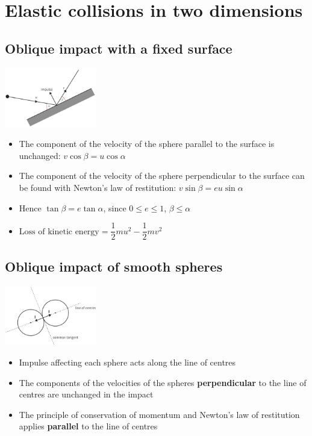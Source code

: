 \documentclass[11pt, A4paper]{article}
\begin{document}
	\section[5 Elastic collisions in two dimensions]{Elastic collisions in two dimensions}
	\subsection{Oblique impact with a fixed surface}
	\includegraphics[width=0.3\textwidth]{obliqueimpact}
	\begin{itemize}
		\item The component of the velocity of the sphere parallel to the surface is unchanged: $v\cos\beta = u\cos\alpha$
		\item The component of the velocity of the sphere perpendicular to the surface can be found with Newton's law of restitution: $v\sin\beta = eu\sin\alpha$
		\item Hence $\tan\beta = e\tan\alpha$, since $0 \leq e \leq 1$, $\beta \leq \alpha$
		\item $\text{Loss of kinetic energy}=\dfrac{1}{2}mu^2-\dfrac{1}{2}mv^2$
	\end{itemize}
	\subsection{Oblique impact of smooth spheres}
	\includegraphics[width=0.3\textwidth]{oblique_2_balls}
	\begin{itemize}
		\item Impulse affecting each sphere acts along the line of centres
		\item The components of the velocities of the spheres \textbf{perpendicular}  to the line of centres are unchanged in the impact
		\item The principle of conservation of momentum and Newton's law of restitution applies \textbf{parallel} to the line of centres
	\end{itemize}
	
	
	
	
	
\end{document}
